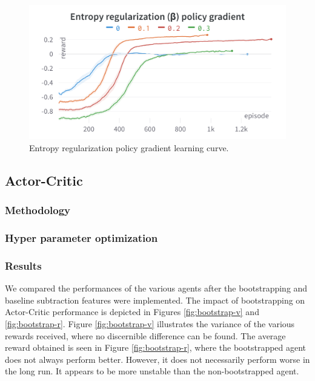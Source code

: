 \documentclass{article}
\begin{document}
\begin{figure}[htbp]
    \centering
    \includegraphics[width=\linewidth]{figs/ER-PG.png}
    \caption{Entropy regularization policy gradient learning curve.}
    \label{fig:er-pg}
\end{figure}


\subsection{Actor-Critic}
\label{A-Actor-Critic}


\subsubsection{Methodology}
\label{AC-Method}

\subsubsection{Hyper parameter optimization}
\label{AC-HPO}

\subsubsection{Results}
\label{AC-Results}

We compared the performances of the various agents after the bootstrapping and baseline subtraction features were implemented.
The impact of bootstrapping on Actor-Critic performance is depicted in Figures \ref{fig:bootstrap-v} and \ref{fig:bootstrap-r}.
Figure \ref{fig:bootstrap-v} illustrates the variance of the various rewards received, where no discernible difference can be found.
The average reward obtained is seen in Figure \ref{fig:bootstrap-r}, where the bootstrapped agent does not always perform better.
However, it does not necessarily perform worse in the long run. It appears to be more unstable than the non-bootstrapped agent.
\end{document}
